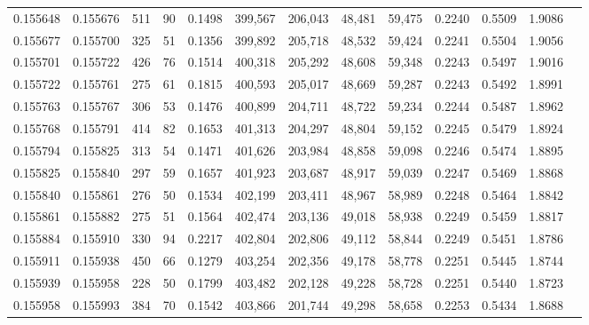 \begin{tabular}{rrrrrrrrrrrrr}
0.155648 & 0.155676 &   511 &  90 &                                     0.1498 & 399,567 & 206,043 &  48,481 &  59,475 & 0.2240 & 0.5509 & 1.9086 \\
0.155677 & 0.155700 &   325 &  51 &                                     0.1356 & 399,892 & 205,718 &  48,532 &  59,424 & 0.2241 & 0.5504 & 1.9056 \\
0.155701 & 0.155722 &   426 &  76 &                                     0.1514 & 400,318 & 205,292 &  48,608 &  59,348 & 0.2243 & 0.5497 & 1.9016 \\
0.155722 & 0.155761 &   275 &  61 &                                     0.1815 & 400,593 & 205,017 &  48,669 &  59,287 & 0.2243 & 0.5492 & 1.8991 \\
0.155763 & 0.155767 &   306 &  53 &                                     0.1476 & 400,899 & 204,711 &  48,722 &  59,234 & 0.2244 & 0.5487 & 1.8962 \\
0.155768 & 0.155791 &   414 &  82 &                                     0.1653 & 401,313 & 204,297 &  48,804 &  59,152 & 0.2245 & 0.5479 & 1.8924 \\
0.155794 & 0.155825 &   313 &  54 &                                     0.1471 & 401,626 & 203,984 &  48,858 &  59,098 & 0.2246 & 0.5474 & 1.8895 \\
0.155825 & 0.155840 &   297 &  59 &                                     0.1657 & 401,923 & 203,687 &  48,917 &  59,039 & 0.2247 & 0.5469 & 1.8868 \\
0.155840 & 0.155861 &   276 &  50 &                                     0.1534 & 402,199 & 203,411 &  48,967 &  58,989 & 0.2248 & 0.5464 & 1.8842 \\
0.155861 & 0.155882 &   275 &  51 &                                     0.1564 & 402,474 & 203,136 &  49,018 &  58,938 & 0.2249 & 0.5459 & 1.8817 \\
0.155884 & 0.155910 &   330 &  94 &                                     0.2217 & 402,804 & 202,806 &  49,112 &  58,844 & 0.2249 & 0.5451 & 1.8786 \\
0.155911 & 0.155938 &   450 &  66 &                                     0.1279 & 403,254 & 202,356 &  49,178 &  58,778 & 0.2251 & 0.5445 & 1.8744 \\
0.155939 & 0.155958 &   228 &  50 &                                     0.1799 & 403,482 & 202,128 &  49,228 &  58,728 & 0.2251 & 0.5440 & 1.8723 \\
0.155958 & 0.155993 &   384 &  70 &                                     0.1542 & 403,866 & 201,744 &  49,298 &  58,658 & 0.2253 & 0.5434 & 1.8688 \\

\end{tabular}
